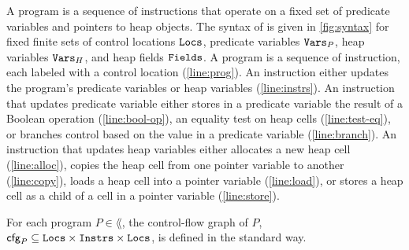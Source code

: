 A \lang program is a sequence of instructions that operate on a fixed
set of predicate variables and pointers to heap objects.
%
The syntax of \lang is given in \autoref{fig:syntax} for fixed finite
sets of control locations $\mathtt{Locs}$, predicate variables $\mathtt{Vars}_P$,
heap variables $\mathtt{Vars}_H$, and heap fields $\mathtt{Fields}$.
%
A program is a sequence of instruction, each labeled with a control
location (\autoref{line:prog}).
%
An instruction either updates the program's predicate variables or
heap variables (\autoref{line:instrs}).
%
An instruction that updates predicate variable either stores in a
predicate variable the result of a Boolean operation
(\autoref{line:bool-op}),
%
an equality test on heap cells (\autoref{line:test-eq}),
%
or branches control based on the value in a predicate variable
(\autoref{line:branch}).
%
An instruction that updates heap variables either allocates a new heap
cell (\autoref{line:alloc}),
%
copies the heap cell from one pointer variable to another
(\autoref{line:copy}),
%
loads a heap cell into a pointer variable (\autoref{line:load}),
%
or stores a heap cell as a child of a cell in a pointer variable
(\autoref{line:store}).

For each program $P \in \lang$, the control-flow graph of $P$,
$\mathsf{cfg}_P \subseteq \mathtt{Locs} \times \mathtt{Instrs} \times \mathtt{Locs}$, is defined in
the standard way.

